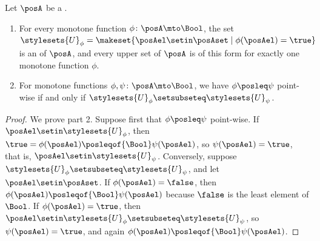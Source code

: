 \begin{lemma}
    \label{lem:upper-sets-as-maps-to-bool}
    Let $\posA$ be a .
    \begin{enumerate}
        \item For every monotone function $\phi \colon \posA \mto \Bool$, the set $\stylesets{U}_\phi = \makeset{\posAel \setin \posAset \mid \phi(\posAel) = \true}$ is an  of $\posA$, and every upper set of $\posA$ is of this form for exactly one monotone function $\phi$.
        \item For monotone functions $\phi, \psi \colon \posA \mto \Bool$, we have $\phi \posleq \psi$ point-wise if and only if $\stylesets{U}_\phi \setsubseteq \stylesets{U}_\psi$.
    \end{enumerate}
\end{lemma}
\begin{proof}
    We prove part 2.
    Suppose first that $\phi \posleq \psi$ point-wise.
    If $\posAel \setin \stylesets{U}_\phi$, then $\true = \phi(\posAel) \posleqof{\Bool} \psi(\posAel)$, so $\psi(\posAel) = \true$, that is, $\posAel \setin \stylesets{U}_\psi$.
    Conversely, suppose $\stylesets{U}_\phi \setsubseteq \stylesets{U}_\psi$, and let $\posAel \setin \posAset$.
    If $\phi(\posAel) = \false$, then $\phi(\posAel) \posleqof{\Bool} \psi(\posAel)$ because $\false$ is the least element of $\Bool$.
    If $\phi(\posAel) = \true$, then $\posAel \setin \stylesets{U}_\phi \setsubseteq \stylesets{U}_\psi$, so $\psi(\posAel) = \true$, and again $\phi(\posAel) \posleqof{\Bool} \psi(\posAel)$.
\end{proof}

